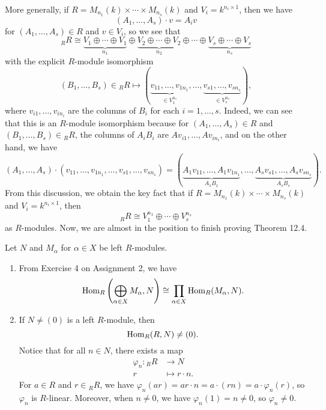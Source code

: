 More generally, if $R = M_{n_1}(k) \times \cdots \times M_{n_s}(k)$ and 
$V_i = k^{n_i \times 1}$, then we have 
\[ (A_1, \dots, A_s) \cdot v = A_i v \] 
for $(A_1, \dots, A_s) \in R$ and $v \in V_i$, so we see that 
\[ {}_R R \cong \underbrace{V_1 \oplus \cdots \oplus V_1}_{n_1} 
\oplus \underbrace{V_2 \oplus \cdots \oplus V_2}_{n_2} \oplus \cdots 
\oplus \underbrace{V_s \oplus \cdots \oplus V_s}_{n_s} \] 
with the explicit $R$-module isomorphism 
\[ (B_1, \dots, B_s) \in {}_R R \mapsto 
(\underbrace{v_{11}, \dots, v_{1n_1}}_{\in V_1^{n_1}}, 
\dots, \underbrace{v_{s1}, \dots, v_{sn_s}}_{\in V_s^{n_s}}), \] 
where $v_{i1}, \dots, v_{in_i}$ are the columns of $B_i$ for each 
$i = 1, \dots, s$. Indeed, we can see that this is an $R$-module isomorphism 
because for $(A_1, \dots, A_s) \in R$ and $(B_1, \dots, B_s) \in {}_R R$, the 
columns of $A_i B_i$ are $Av_{i1}, \dots, Av_{in_i}$, and on the other hand, 
we have 
\[ (A_1, \dots, A_s) \cdot (v_{11}, \dots, v_{1n_1}, \dots, 
v_{s1}, \dots, v_{sn_s}) = 
(\underbrace{A_1 v_{11}, \dots, A_1 v_{1n_1}}_{A_1B_1}, 
\dots, \underbrace{A_s v_{s1}, \dots, A_s v_{sn_s}}_{A_sB_s}). \] 
From this discussion, we obtain the key fact that if $R = M_{n_1}(k) \times \cdots \times 
M_{n_s}(k)$ and $V_i = k^{n_i \times 1}$, then 
\[ {}_R R \cong V_1^{n_1} \oplus \cdots \oplus V_s^{n_s} \] 
as $R$-modules. Now, we are almost in the position to finish proving Theorem 12.4.

\begin{remark}{} Let $N$ and $M_\alpha$ for $\alpha \in X$ be left $R$-modules. 
    \begin{enumerate}[(1)]
        \item From Exercise 4 on Assignment 2, we have 
        \[ \operatorname{Hom}_R \left( \bigoplus_{\alpha \in X} M_\alpha, N \right) 
        \cong \prod_{\alpha \in X} \operatorname{Hom}_R(M_\alpha, N). \] 
        \item If $N \neq (0)$ is a left $R$-module, then 
        \[ \operatorname{Hom}_R(R, N) \neq (0). \] 
        Notice that for all $n \in N$, there exists a map 
        \begin{align*} \varphi_n : {}_R R &\to N \\ r &\mapsto r \cdot n. \end{align*} 
        For $a \in R$ and $r \in {}_R R$, we have $\varphi_n(ar) = ar \cdot n 
        = a \cdot (rn) = a \cdot \varphi_n(r)$, so $\varphi_n$ is $R$-linear. 
        Moreover, when $n \neq 0$, we have $\varphi_n(1) = n \neq 0$, so 
        $\varphi_n \neq 0$. 
    \end{enumerate}
\end{remark}

